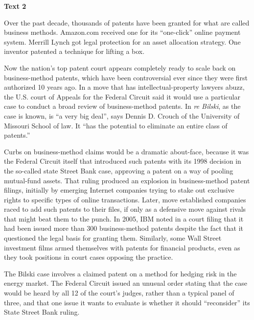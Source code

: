 
\begin{center}\textbf{Text 2}\end{center}

\qquad Over the past decade, thousands of patents have been granted for what are called business methods. Amazon.com received one for its ``one-click'' online payment system. Merrill Lynch got legal protection for an asset allocation strategy. One inventor patented a technique for lifting a box.

\qquad Now the nation's top patent court appears completely ready to scale back on business-method patents, which have been controversial ever since they were first authorized 10 years ago. In a move that has intellectual-property lawyers abuzz, the U.S. court of Appeals for the Federal Circuit said it would use a particular case to conduct a broad review of  business-method patents. In \emph{re Bilski}, as the case is known, is ``a very big deal'', says Dennis D. Crouch of the University of Missouri School of law. It ``has the potential to eliminate an entire class of patents.''

\qquad Curbs on business-method claims would be a dramatic about-face, because it was the Federal Circuit itself that introduced such patents with its 1998 decision in the so-called state Street Bank case, approving a patent on a way of pooling mutual-fund assets. That ruling produced an explosion in business-method patent filings, initially by emerging Internet companies trying to stake out exclusive rights to specific types of online transactions. Later, move established companies raced to add such patents to their files, if only as a defensive move against rivals that might beat them to the punch. In 2005, IBM noted in a court filing that it had been issued more than 300 business-method patents despite the fact that it questioned the legal basis for granting them. Similarly, some Wall Street investment films armed themselves with patents for financial products, even as they took positions in court cases opposing the practice.

\qquad The Bilski case involves a claimed patent on a method for hedging risk in the energy market. The Federal Circuit issued an unusual order stating that the case would be heard by all 12 of the court's judges, rather than a typical panel of three, and that one issue it wants to evaluate is whether it should ``reconsider'' its State Street Bank ruling.


